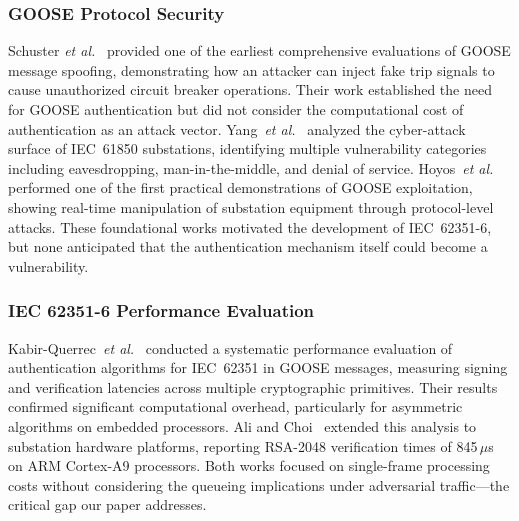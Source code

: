 \documentclass[journal]{IEEEtran}
\begin{document}
\subsubsection{GOOSE Protocol Security}
Schuster \textit{et al.}~\cite{schuster2017goose} provided one of the earliest comprehensive evaluations of GOOSE message spoofing, demonstrating how an attacker can inject fake trip signals to cause unauthorized circuit breaker operations. Their work established the need for GOOSE authentication but did not consider the computational cost of authentication as an attack vector. Yang~\textit{et al.}~\cite{yang2013cyber} analyzed the cyber-attack surface of IEC~61850 substations, identifying multiple vulnerability categories including eavesdropping, man-in-the-middle, and denial of service. Hoyos~\textit{et al.}~\cite{hoyos2012real} performed one of the first practical demonstrations of GOOSE exploitation, showing real-time manipulation of substation equipment through protocol-level attacks. These foundational works motivated the development of IEC~62351-6, but none anticipated that the authentication mechanism itself could become a vulnerability.

\subsubsection{IEC 62351-6 Performance Evaluation}
Kabir-Querrec~\textit{et al.}~\cite{kabir2020goose} conducted a systematic performance evaluation of authentication algorithms for IEC~62351 in GOOSE messages, measuring signing and verification latencies across multiple cryptographic primitives. Their results confirmed significant computational overhead, particularly for asymmetric algorithms on embedded processors. Ali and Choi~\cite{ali2020latency} extended this analysis to substation hardware platforms, reporting RSA-2048 verification times of 845\,$\mu$s on ARM Cortex-A9 processors. Both works focused on single-frame processing costs without considering the queueing implications under adversarial traffic---the critical gap our paper addresses.
\end{document}
